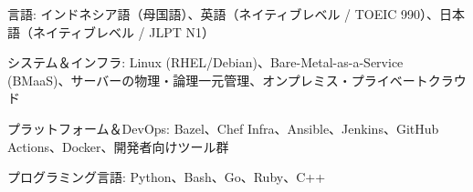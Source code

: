 

\begin{cvparagraph}

\begin{cvbullets}
\item 言語: インドネシア語（母国語）、英語（ネイティブレベル / TOEIC 990）、日本語（ネイティブレベル / JLPT N1）
\item システム＆インフラ: Linux (RHEL/Debian)、Bare-Metal-as-a-Service (BMaaS)、サーバーの物理・論理一元管理、オンプレミス・プライベートクラウド
\item プラットフォーム＆DevOps: Bazel、Chef Infra、Ansible、Jenkins、GitHub Actions、Docker、開発者向けツール群
\item プログラミング言語: Python、Bash、Go、Ruby、C++
\end{cvbullets}
\end{cvparagraph}
